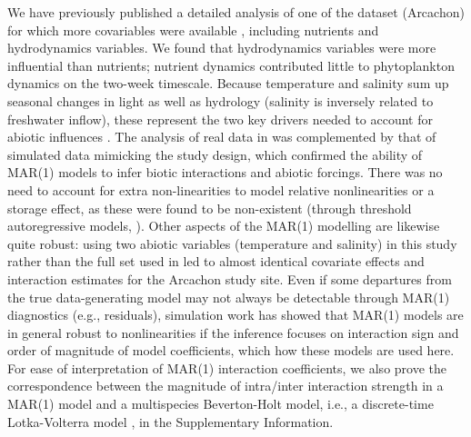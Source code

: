 \documentclass[10pt]{article}
\begin{document}
We have previously published a detailed analysis of one of the dataset
(Arcachon) for which more covariables were available \citep{barraquand_coastal_2018},
including nutrients and hydrodynamics variables. We found that hydrodynamics
variables were more influential than nutrients; nutrient dynamics
contributed little to phytoplankton dynamics on the two-week timescale.
Because temperature and salinity sum up seasonal changes in light
as well as hydrology (salinity is inversely related to freshwater
inflow), these represent the two key drivers needed to account for
abiotic influences \citep{scheef_inferring_2013}. The analysis of
real data in \citet{barraquand_coastal_2018} was complemented by
that of simulated data mimicking the study design, which confirmed
the ability of MAR(1) models to infer biotic interactions and abiotic
forcings. There was no need to account for extra non-linearities to
model relative nonlinearities or a storage effect, as these were found
to be non-existent (through threshold autoregressive models, \citealp{barraquand_coastal_2018}).
Other aspects of the MAR(1) modelling are likewise quite robust: using
two abiotic variables (temperature and salinity) in this study rather
than the full set used in \citet{barraquand_coastal_2018} led to
almost identical covariate effects and interaction estimates for the
Arcachon study site. Even if some departures from the true data-generating
model may not always be detectable through MAR(1) diagnostics (e.g.,
residuals), simulation work has showed that MAR(1) models are in general
robust to nonlinearities \citep{certain_how_2018} if the inference
focuses on interaction sign and order of magnitude of model coefficients,
which how these models are used here. For
ease of interpretation of MAR(1) interaction coefficients, we also
prove the correspondence between the magnitude of intra/inter interaction
strength in a MAR(1) model and a multispecies Beverton-Holt model,
i.e., a discrete-time Lotka-Volterra model \citep{cushing_discrete_2004},
in the Supplementary Information.
\end{document}

